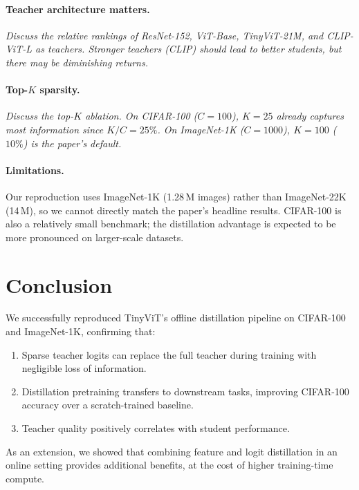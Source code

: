 \documentclass[10pt,twocolumn]{article}
\begin{document}
\paragraph{Teacher architecture matters.}
\textit{Discuss the relative rankings of ResNet-152, ViT-Base, TinyViT-21M,
and CLIP-ViT-L as teachers.  Stronger teachers (CLIP) should lead to better
students, but there may be diminishing returns.}

\paragraph{Top-$K$ sparsity.}
\textit{Discuss the top-$K$ ablation.  On CIFAR-100 ($C\!=\!100$),
$K\!=\!25$ already captures most information since $K/C = 25\%$.  On
ImageNet-1K ($C\!=\!1000$), $K\!=\!100$ ($10\%$) is the paper's default.}

\paragraph{Limitations.}
Our reproduction uses ImageNet-1K (1.28\,M images) rather than
ImageNet-22K (14\,M), so we cannot directly match the paper's headline
results.
CIFAR-100 is also a relatively small benchmark; the distillation
advantage is expected to be more pronounced on larger-scale datasets.

\section{Conclusion}
\label{sec:conclusion}

We successfully reproduced TinyViT's offline distillation pipeline on
CIFAR-100 and ImageNet-1K, confirming that:
\begin{enumerate}
  \item Sparse teacher logits can replace the full teacher during training
        with negligible loss of information.
  \item Distillation pretraining transfers to downstream tasks, improving
        CIFAR-100 accuracy over a scratch-trained baseline.
  \item Teacher quality positively correlates with student performance.
\end{enumerate}
As an extension, we showed that combining feature and logit distillation
in an online setting provides additional benefits, at the cost of
higher training-time compute.
\end{document}
